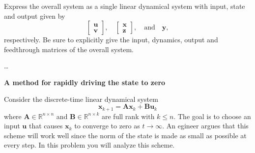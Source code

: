 \documentclass[12pt]{exam}
\begin{document}
\begin{questions}
  Express the overall system as a single linear dynamical system with input, state and output given by
  \[
  \begin{bmatrix}
    \bm{u} \\ \bm{v}
  \end{bmatrix},
  \quad
  \begin{bmatrix}
    \bm{x} \\ \bm{z}
  \end{bmatrix},
  \quad
  \text{and}
  \quad
  \bm{y},
  \]
  respectively.
  Be sure to explicitly give the input, dynamics, output and feedthrough matrices of the overall system.


  \begin{solution}
    {\color{blue}
      \ldots
    }
  \end{solution}





  \question \textbf{A method for rapidly driving the state to zero}

  Consider the discrete-time linear dynamical system
  \[
  \bm{x}_{k+1} = \bm{Ax}_k + \bm{Bu}_k
  \]
  where $\bm{A} \in \mathbb{R}^{n \times n}$ and $\bm{B} \in \mathbb{R}^{n \times k}$ are full rank with $k \leq n$.
  The goal is to choose an input $\bm{u}$ that causes $\bm{x}_k$ to converge to zero as $t \to \infty$.
  An egineer argues that this scheme will work well since the norm of the state is made as small as possible at every step.
  In this problem you will analyze this scheme.



\end{questions}
\end{document}
